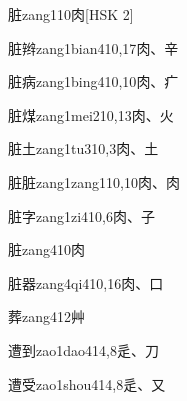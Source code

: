 \begin{entry}{脏}{zang1}{10}{⾁}[HSK 2]
\end{entry}

\begin{entry}{脏辫}{zang1bian4}{10,17}{⾁、⾟}
\end{entry}

\begin{entry}{脏病}{zang1bing4}{10,10}{⾁、⽧}
\end{entry}

\begin{entry}{脏煤}{zang1mei2}{10,13}{⾁、⽕}
\end{entry}

\begin{entry}{脏土}{zang1tu3}{10,3}{⾁、⼟}
\end{entry}

\begin{entry}{脏脏}{zang1zang1}{10,10}{⾁、⾁}
\end{entry}

\begin{entry}{脏字}{zang1zi4}{10,6}{⾁、⼦}
\end{entry}

\begin{entry}{脏}{zang4}{10}{⾁}
\end{entry}

\begin{entry}{脏器}{zang4qi4}{10,16}{⾁、⼝}
\end{entry}

\begin{entry}{葬}{zang4}{12}{⾋}
\end{entry}

\begin{entry}{遭到}{zao1dao4}{14,8}{⾡、⼑}
\end{entry}

\begin{entry}{遭受}{zao1shou4}{14,8}{⾡、⼜}
\end{entry}

